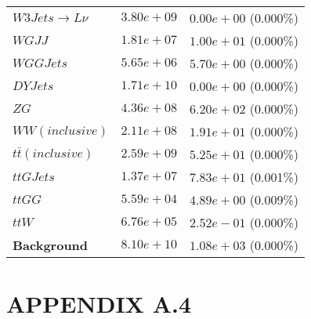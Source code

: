 \begin{table}[h!]
\begin{tabular}{ |l|c|c| }
                 $W3Jets \rightarrow L\nu$ &  $3.80e+09$  &  $0.00e+00$ (0.000\%) \\
                                    $WGJJ$ &  $1.81e+07$  &  $1.00e+01$ (0.000\%) \\
                                 $WGGJets$ &  $5.65e+06$  &  $5.70e+00$ (0.000\%) \\
                                  $DYJets$ &  $1.71e+10$  &  $0.00e+00$ (0.000\%) \\
                                      $ZG$ &  $4.36e+08$  &  $6.20e+02$ (0.000\%) \\
                           $WW(inclusive)$ &  $2.11e+08$  &  $1.91e+01$ (0.000\%) \\
                    $t\bar{t} (inclusive)$ &  $2.59e+09$  &  $5.25e+01$ (0.000\%) \\
                                 $ttGJets$ &  $1.37e+07$  &  $7.83e+01$ (0.001\%) \\
                                    $ttGG$ &  $5.59e+04$  &  $4.89e+00$ (0.009\%) \\
                                     $ttW$ &  $6.76e+05$  &  $2.52e-01$ (0.000\%) \\
                       \textbf{Background} &  $8.10e+10$  &  $1.08e+03$ (0.000\%) \\
    \hline
\end{tabular}
\label{fullyleptonic-cutflow}
\end{table}


\section*{APPENDIX A.4}

